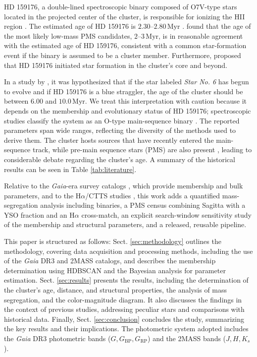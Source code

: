 \documentclass{aa}
\begin{document}
HD 159176, a double-lined spectroscopic binary composed of O7V-type stars located in the projected center of the cluster, is responsible for ionizing the HII region \citep{2016ApJ...832..211P}. The estimated age of HD 159176 is $2.30$--$2.80\,\mathrm{Myr}$ \citep{2010AA...511A..25R}. \citet{2010AA...511A..25R} found that the age of the most likely low-mass PMS candidates, $2$--$3\,\mathrm{Myr}$, is in reasonable agreement with the estimated age of HD 159176, consistent with a common star-formation event if the binary is assumed to be a cluster member. Furthermore, \citet{1978MNRAS.182..607F} proposed that HD 159176 initiated star formation in the cluster's core and beyond.

In a study by \citet{2018AA...610A..30A}, it was hypothesized that if the star labeled \textit{Star No. 6} has begun to evolve and if HD 159176 is a blue straggler, the age of the cluster should be between $6.00$ and $10.0\,\mathrm{Myr}$. We treat this interpretation with caution because it depends on the membership and evolutionary status of HD 159176; spectroscopic studies classify the system as an O-type main-sequence binary \citep{1993Obs...113..204S,2007A&A...474..193L,2016ApJ...832..211P}. The reported parameters span wide ranges, reflecting the diversity of the methods used to derive them. The cluster hosts sources that have recently entered the main-sequence track, while pre-main sequence stars (PMS) are also present \citep{2019MNRAS.484.5102K}, leading to considerable debate regarding the cluster's age. A summary of the historical results can be seen in Table \ref{tab:literature}.

Relative to the \textit{Gaia}-era survey catalogs \citep{2020AA...640A...1C,2022ApJS..262....7H,2024arXiv240305143H}, which provide membership and bulk parameters, and to the H$\alpha$/CTTS studies \citep{2010AA...511A..25R,2019MNRAS.484.5102K}, this work adds a quantified mass-segregation analysis including binaries, a PMS census combining Sagitta with a YSO fraction and an H$\alpha$ cross-match, an explicit search-window sensitivity study of the membership and structural parameters, and a released, reusable pipeline.

This paper is structured as follows: Sect. \ref{sec:methodology} outlines the methodology, covering data acquisition and processing methods, including the use of the \textit{Gaia} DR3 and 2MASS catalogs, and describes the membership determination using HDBSCAN and the Bayesian analysis for parameter estimation. Sect. \ref{sec:results} presents the results, including the determination of the cluster's age, distance, and structural properties, the analysis of mass segregation, and the color-magnitude diagram. It also discusses the findings in the context of previous studies, addressing peculiar stars and comparisons with historical data. Finally, Sect. \ref{sec:conclusion} concludes the study, summarizing the key results and their implications. The photometric system adopted includes the \textit{Gaia} DR3 photometric bands ($G, G_{\text{BP}}, G_{\text{RP}}$) and the 2MASS bands ($J, H, K_s$).
\end{document}
